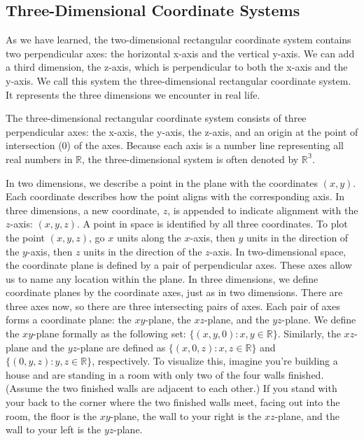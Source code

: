 \documentclass{report}
\begin{document}
    \pagebreak 
    \bigbreak \noindent 

    \subsection{Three-Dimensional Coordinate Systems}
    \bigbreak \noindent 
    As we have learned, the two-dimensional rectangular coordinate system contains two perpendicular axes: the horizontal x-axis and the vertical y-axis. We can add a third dimension, the z-axis, which is perpendicular to both the x-axis and the y-axis. We call this system the three-dimensional rectangular coordinate system. It represents the three dimensions we encounter in real life.
    \bigbreak \noindent 
    \begin{dfn}
        The three-dimensional rectangular coordinate system consists of three perpendicular axes: the x-axis, the y-axis, the z-axis, and an origin at the point of intersection (0) of the axes. Because each axis is a number line representing all real numbers in  $\mathbb{R} $, the three-dimensional system is often denoted by  $\mathbb{R^{3}} $.
    \end{dfn}
    \bigbreak \noindent 
    \bigbreak \noindent 
    In two dimensions, we describe a point in the plane with the coordinates $(x,y)$. Each coordinate describes how the point aligns with the corresponding axis. In three dimensions, a new coordinate, $z$, is appended to indicate alignment with the $z$-axis: $(x,y,z)$. A point in space is identified by all three coordinates. To plot the point $(x,y,z)$, go $x$ units along the $x$-axis, then $y$ units in the direction of the $y$-axis, then $z$ units in the direction of the $z$-axis.
    \bigbreak \noindent 
    \bigbreak \noindent 
    In two-dimensional space, the coordinate plane is defined by a pair of perpendicular axes. These axes allow us to name any location within the plane. In three dimensions, we define coordinate planes by the coordinate axes, just as in two dimensions. There are three axes now, so there are three intersecting pairs of axes. Each pair of axes forms a coordinate plane: the $xy$-plane, the $xz$-plane, and the $yz$-plane. We define the $xy$-plane formally as the following set: $\{(x,y,0) : x,y \in \mathbb{R}\}$.
    Similarly, the $xz$-plane and the $yz$-plane are defined as $\{(x,0,z) : x,z \in \mathbb{R}\}$
    and $\{(0,y,z) : y,z \in \mathbb{R}\}$,
    respectively.
    \bigbreak \noindent 
    To visualize this, imagine you’re building a house and are standing in a room with only two of the four walls finished. (Assume the two finished walls are adjacent to each other.) If you stand with your back to the corner where the two finished walls meet, facing out into the room, the floor is the $xy$-plane, the wall to your right is the $xz$-plane, and the wall to your left is the $yz$-plane.
\end{document}
